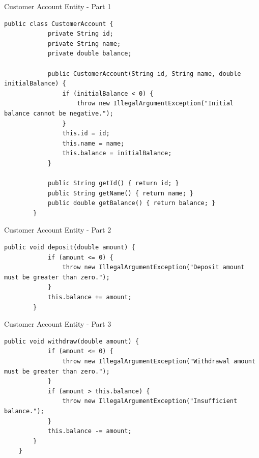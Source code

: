 \documentclass[aspectratio=169, table]{beamer}
\begin{document}
\begin{frame}[fragile]{Customer Account Entity - Part 1}
	\vspace{20pt}
	\begin{lstlisting}[style=JavaStyle]
		public class CustomerAccount {
			private String id;
			private String name;
			private double balance;
			
			public CustomerAccount(String id, String name, double initialBalance) {
				if (initialBalance < 0) {
					throw new IllegalArgumentException("Initial balance cannot be negative.");
				}
				this.id = id;
				this.name = name;
				this.balance = initialBalance;
			}
			
			public String getId() { return id; }
			public String getName() { return name; }
			public double getBalance() { return balance; }
		}
	\end{lstlisting}
\end{frame}

\begin{frame}[fragile]{Customer Account Entity - Part 2}
	\vspace{20pt}
	\begin{lstlisting}[style=JavaStyle]
		public void deposit(double amount) {
			if (amount <= 0) {
				throw new IllegalArgumentException("Deposit amount must be greater than zero.");
			}
			this.balance += amount;
		}
	\end{lstlisting}
\end{frame}

\begin{frame}[fragile]{Customer Account Entity - Part 3}
	\vspace{20pt}
	\begin{lstlisting}[style=JavaStyle]
		public void withdraw(double amount) {
			if (amount <= 0) {
				throw new IllegalArgumentException("Withdrawal amount must be greater than zero.");
			}
			if (amount > this.balance) {
				throw new IllegalArgumentException("Insufficient balance.");
			}
			this.balance -= amount;
		}
	}
\end{lstlisting}
\end{frame}
\end{document}
